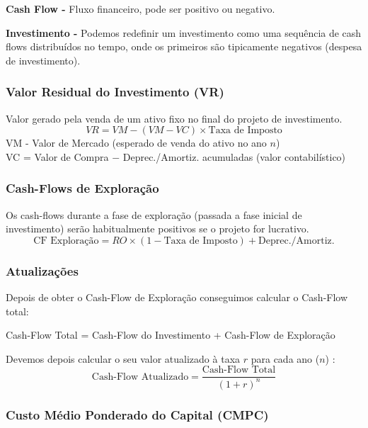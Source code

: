 \documentclass[11pt]{article}
\begin{document}
\textbf{Cash Flow -} Fluxo financeiro, pode ser positivo ou negativo.

\textbf{Investimento -} Podemos redefinir um investimento como uma sequência de cash flows distribuídos no tempo, onde os primeiros são tipicamente negativos (despesa de investimento).

\subsubsection{Valor Residual do Investimento (VR)}

Valor gerado pela venda de um ativo fixo no final do projeto de investimento.
\begin{equation*}
    VR = VM - (VM - VC) \times \text{Taxa de Imposto}
\end{equation*}
VM - Valor de Mercado (esperado de venda do ativo no ano $n$) \\
VC = Valor de Compra $-$ Deprec./Amortiz. acumuladas (valor contabilístico)

\subsubsection{Cash-Flows de Exploração}

Os cash-flows durante a fase de exploração (passada a fase inicial de investimento) serão habitualmente positivos se o projeto for lucrativo.
\begin{equation*}
    \text{CF Exploração} =
    RO \times (1 - \text{Taxa de Imposto}) + \text{Deprec./Amortiz.}
\end{equation*}

\subsubsection{Atualizações}

Depois de obter o Cash-Flow de Exploração conseguimos calcular o Cash-Flow total:
\begin{center}
    Cash-Flow Total = Cash-Flow do Investimento + Cash-Flow de Exploração
\end{center}

Devemos depois calcular o seu valor atualizado à taxa $r$ para cada ano ($n$) :
\begin{equation*}
    \text{Cash-Flow Atualizado} = \frac{\text{Cash-Flow Total}}{(1+r)^n}
\end{equation*}

\subsubsection{Custo Médio Ponderado do Capital (CMPC)}
\end{document}
